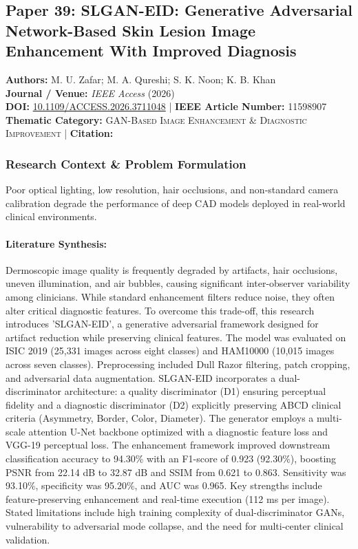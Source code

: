 \subsection{Paper 39: SLGAN-EID: Generative Adversarial Network-Based Skin Lesion Image Enhancement With Improved Diagnosis}
\label{sec:paper_39}

\begin{tcolorbox}[colback=gray!5!white,colframe=gray!75!black,title=\textbf{Metadata \& Citation Summary}]
\textbf{Authors:} M. U. Zafar; M. A. Qureshi; S. K. Noon; K. B. Khan \\
\textbf{Journal / Venue:} \textit{IEEE Access} (2026) \\
\textbf{DOI:} \href{https://doi.org/10.1109/ACCESS.2026.3711048}{10.1109/ACCESS.2026.3711048} \quad | \quad \textbf{IEEE Article Number:} 11598907 \\
\textbf{Thematic Category:} \textsc{GAN-Based Image Enhancement \& Diagnostic Improvement} \quad | \quad \textbf{Citation:} \cite{11598907}
\end{tcolorbox}

\subsubsection*{Research Context \& Problem Formulation}
Poor optical lighting, low resolution, hair occlusions, and non-standard camera calibration degrade the performance of deep CAD models deployed in real-world clinical environments.

\paragraph{Literature Synthesis:} Dermoscopic image quality is frequently degraded by artifacts, hair occlusions, uneven illumination, and air bubbles, causing significant inter-observer variability among clinicians. While standard enhancement filters reduce noise, they often alter critical diagnostic features. To overcome this trade-off, this research introduces 'SLGAN-EID', a generative adversarial framework designed for artifact reduction while preserving clinical features. The model was evaluated on ISIC 2019 (25,331 images across eight classes) and HAM10000 (10,015 images across seven classes). Preprocessing included Dull Razor filtering, patch cropping, and adversarial data augmentation. SLGAN-EID incorporates a dual-discriminator architecture: a quality discriminator (D1) ensuring perceptual fidelity and a diagnostic discriminator (D2) explicitly preserving ABCD clinical criteria (Asymmetry, Border, Color, Diameter). The generator employs a multi-scale attention U-Net backbone optimized with a diagnostic feature loss and VGG-19 perceptual loss. The enhancement framework improved downstream classification accuracy to 94.30\% with an F1-score of 0.923 (92.30\%), boosting PSNR from 22.14 dB to 32.87 dB and SSIM from 0.621 to 0.863. Sensitivity was 93.10\%, specificity was 95.20\%, and AUC was 0.965. Key strengths include feature-preserving enhancement and real-time execution (112 ms per image). Stated limitations include high training complexity of dual-discriminator GANs, vulnerability to adversarial mode collapse, and the need for multi-center clinical validation.

